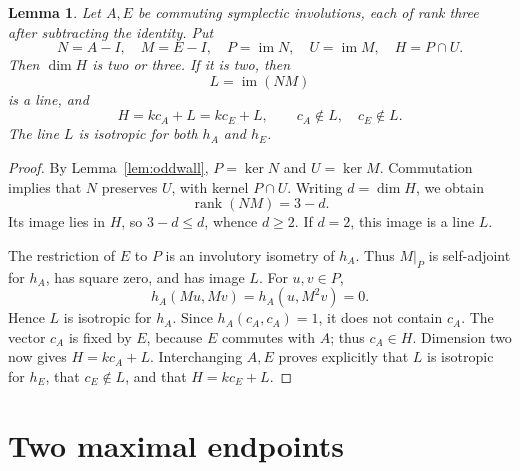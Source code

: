 \documentclass[11pt]{article}
\newtheorem{lemma}[theorem]{Lemma}
\newcommand{\im}{\operatorname{im}}
\begin{document}
\begin{lemma}\label{lem:commutingmaximal}
Let \(A,E\) be commuting symplectic involutions, each of rank three
after subtracting the identity. Put
\[
 N=A-I,\quad M=E-I,\quad P=\im N,\quad U=\im M,\quad
 H=P\cap U.
\]
Then \(\dim H\) is two or three. If it is two, then
\[
 L=\im(NM)
\]
is a line, and
\[
 H=kc_A+L=kc_E+L,\qquad c_A\notin L,\quad c_E\notin L.  \tag{5}
\]
The line \(L\) is isotropic for both \(h_A\) and \(h_E\).
\end{lemma}
\begin{proof}
By Lemma~\ref{lem:oddwall}, \(P=\ker N\) and \(U=\ker M\).
Commutation implies that \(N\) preserves \(U\), with kernel
\(P\cap U\). Writing \(d=\dim H\), we obtain
\[
       \operatorname{rank}(NM)=3-d.
\]
Its image lies in \(H\), so \(3-d\leq d\), whence \(d\geq2\).
If \(d=2\), this image is a line \(L\).

The restriction of \(E\) to \(P\) is an involutory isometry of
\(h_A\). Thus \(M|_P\) is self-adjoint for \(h_A\), has square
zero, and has image \(L\). For \(u,v\in P\),
\[
 h_A(Mu,Mv)=h_A(u,M^2v)=0.
\]
Hence \(L\) is isotropic for \(h_A\). Since
\(h_A(c_A,c_A)=1\), it does not contain \(c_A\).
The vector \(c_A\) is fixed by \(E\), because \(E\) commutes with
\(A\); thus \(c_A\in H\). Dimension two now gives
\(H=kc_A+L\). Interchanging \(A,E\) proves explicitly that
\(L\) is isotropic for \(h_E\), that \(c_E\notin L\), and that
\(H=kc_E+L\).
\end{proof}

\section{Two maximal endpoints}
\end{document}
